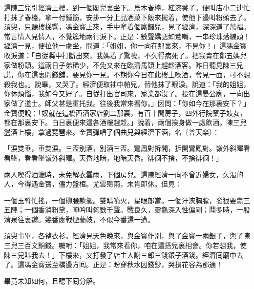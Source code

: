 這陳三兒引經濟上樓，到一個閣兒裏坐下。烏木春檯，紅漆凳子。便叫店小二連忙打抹了春檯，拿一付鍾筯，安排一分上品酒菓下飯來擺着，使他下邊叫粉頭去了。須臾，只聽樓梯響，馮金寳上來，手中拿着個廝鑼兒，見了經濟，深深道了萬福。常言情人見情人，不覺簇地兩行淚下。正是：數聲嬌語如鶯囀，一串珍珠落線頭！經濟一見，便拉他一䖏坐，問道：「姐姐，你一向在那裏來，不見你！」這馮金寳收淚道：「自従縣中打斷出來，我媽着了驚唬，不久得病死了。把我賣在鄭五媽兒家做粉頭。這兩日子弟稀少，不免又來在臨清馬頭上趕趁酒客。昨日聽見陳三兒説，你在這裏開錢舖，要見你一見。不期你今日在此樓上喫酒，會見一面，可不想殺我也。」說畢，又哭了。經濟便取袖中帕兒，替他抹了眼淚，說道：「我的姐姐，你休煩惱，我如今又好了。自従打出官司來，家業都沒了。投在這晏公廟，一向出家做了道士。師父甚是重托我。往後我常來看你。」因問：「你如今在那裏安下？」金寳便說：「奴就在這橋西洒家店劉二那裏，有百十間房子，四外行院窠子妓女，都在那裏安下。白日裏便來這各酒樓趕趁。」說着，兩個挨身做一處飲酒。陳三兒盪酒上樓，拿過琵琶來。金寳彈唱了個曲兒與經濟下酒，名〔普天楽〕：

\begin{myquote}
「淚雙垂，垂雙淚。三盃别酒，別酒三盃。鸞鳳對拆開，拆開鸞鳳對。嶺外斜暉看看墜，看看墜嶺外斜暉。天昏地暗，地暗天昏。徘徊不捨，不捨徘徊！」
\end{myquote}

兩人喫得酒濃時，未免解衣雲雨，下個房兒。這陳經濟一向不曾近婦女，久渴的人，今得遇金寳，儘力盤桓。尤雲殢雨，未肯即休。但見：

\begin{myquote}
一個玉臂忙搖，一個柳腰款擺。雙睛噴火，星眼郎當。一個汗浹胸膛，發狠要贏三五陣；一個香消粉黛，呻吟叫夠數千聲。戰良久，靈龜深入性偏剛；鬦多時，一股清泉往裏邈。幾番鏖戰煙蘭妓，不似今番這一遭。
\end{myquote}

須臾事畢，各整衣衫。經濟見天色晚來，與金寳作别，與了金寳一兩銀子，與了陳三兒三百文銅錢。囑咐：「姐姐，我常來看你，咱在這搭兒裏相會。你若想我，使陳三兒叫我去！」下樓來，又打發了店主人謝三郎三錢銀子酒錢。經濟囘廟中去了。這馮金寳送至橋邊方囘。正是：盼穿秋水因錢鈔，哭損花容為鄧通！

畢竟未知如何，且聽下囘分解。

